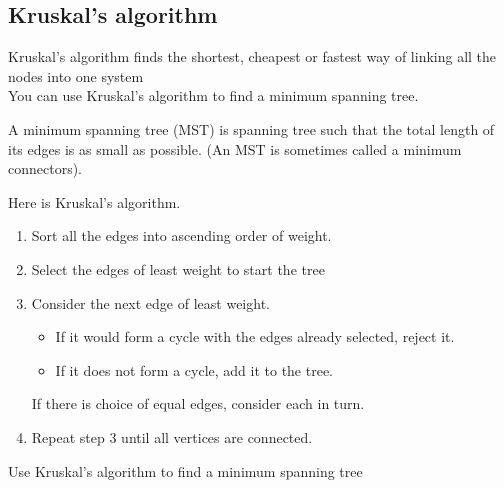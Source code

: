 \documentclass[a4paper]{article}
\begin{document}
\subsection{Kruskal's algorithm}
Kruskal's algorithm finds the shortest, cheapest or fastest way of linking all the nodes into one system\\
You can use Kruskal's algorithm to find a minimum spanning tree.
\begin{defi}
	A minimum spanning tree (MST) is spanning tree such that the total length of its edges is as small as possible. (An MST is sometimes called a minimum connectors).
\end{defi}

\begin{defi}
	Here is Kruskal's algorithm.
	\begin{enumerate}
		\item Sort all the edges into ascending order of weight.
		\item Select the edges of least weight to start the tree
		\item Consider the next edge of least weight.\begin{itemize}
			      \item If it would form a cycle with the edges already selected, reject it. \item If it does not form a cycle, add it to the tree.
		      \end{itemize}
		      If there is choice of equal edges, consider each in turn.
		\item Repeat step 3 until all vertices are connected.
	\end{enumerate}

\end{defi}

\begin{eg}
	Use Kruskal's algorithm to find a minimum spanning tree
\end{eg}

\begin{eg}

\end{eg}
\end{document}
